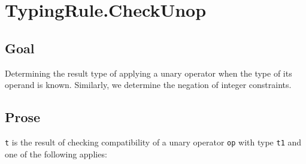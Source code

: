 \documentclass{book}
\begin{document}
\section{TypingRule.CheckUnop \label{sec:TypingRule.CheckUnop}}

\subsection{Goal}
  Determining the result type of applying a unary operator when the type of its operand is known.
  Similarly, we determine the negation of integer constraints.

\subsection{Prose}
  \texttt{t} is the result of checking compatibility of a unary operator \texttt{op} with
  type \texttt{t1} and one of the following applies:
\end{document}
